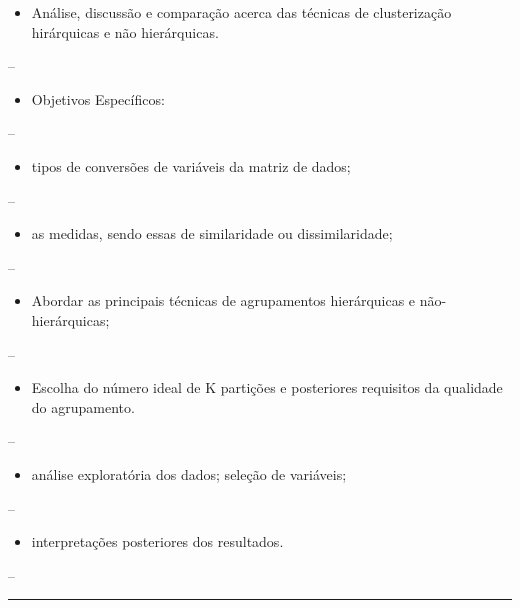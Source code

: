 \documentclass[
]{article}
\providecommand{\tightlist}{%
  \setlength{\itemsep}{0pt}\setlength{\parskip}{0pt}}
\begin{document}
\begin{itemize}
\tightlist
\item
  Análise, discussão e comparação acerca das técnicas de clusterização
  hirárquicas e não hierárquicas.
\end{itemize}

--

\begin{itemize}
\tightlist
\item
  Objetivos Específicos:
\end{itemize}

--

\begin{itemize}
\tightlist
\item
  tipos de conversões de variáveis da matriz de dados;
\end{itemize}

--

\begin{itemize}
\tightlist
\item
  as medidas, sendo essas de similaridade ou dissimilaridade;
\end{itemize}

--

\begin{itemize}
\tightlist
\item
  Abordar as principais técnicas de agrupamentos hierárquicas e
  não-hierárquicas;
\end{itemize}

--

\begin{itemize}
\tightlist
\item
  Escolha do número ideal de K partições e posteriores requisitos da
  qualidade do agrupamento.
\end{itemize}

--

\begin{itemize}
\tightlist
\item
  análise exploratória dos dados; seleção de variáveis;
\end{itemize}

--

\begin{itemize}
\tightlist
\item
  interpretações posteriores dos resultados.
\end{itemize}

--

\begin{center}\rule{0.5\linewidth}{0.5pt}\end{center}
\end{document}

